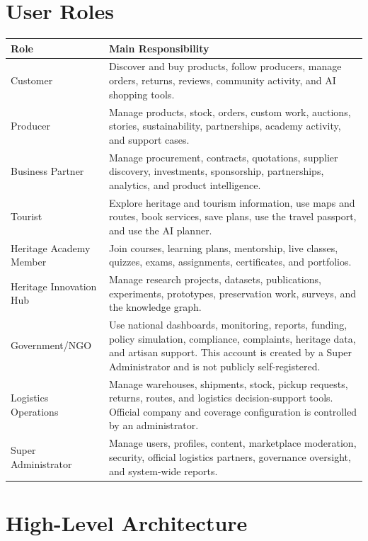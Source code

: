 \documentclass[12pt,a4paper]{report}
\begin{document}
\section{User Roles}

\begin{longtable}{p{}p{}}
\toprule
\textbf{Role} & \textbf{Main Responsibility} \\
\midrule
Customer & Discover and buy products, follow producers, manage orders, returns, reviews, community activity, and AI shopping tools. \\
Producer & Manage products, stock, orders, custom work, auctions, stories, sustainability, partnerships, academy activity, and support cases. \\
Business Partner & Manage procurement, contracts, quotations, supplier discovery, investments, sponsorship, partnerships, analytics, and product intelligence. \\
Tourist & Explore heritage and tourism information, use maps and routes, book services, save plans, use the travel passport, and use the AI planner. \\
Heritage Academy Member & Join courses, learning plans, mentorship, live classes, quizzes, exams, assignments, certificates, and portfolios. \\
Heritage Innovation Hub & Manage research projects, datasets, publications, experiments, prototypes, preservation work, surveys, and the knowledge graph. \\
Government/NGO & Use national dashboards, monitoring, reports, funding, policy simulation, compliance, complaints, heritage data, and artisan support. This account is created by a Super Administrator and is not publicly self-registered. \\
Logistics Operations & Manage warehouses, shipments, stock, pickup requests, returns, routes, and logistics decision-support tools. Official company and coverage configuration is controlled by an administrator. \\
Super Administrator & Manage users, profiles, content, marketplace moderation, security, official logistics partners, governance oversight, and system-wide reports. \\
\bottomrule
\end{longtable}

\section{High-Level Architecture}
\end{document}
